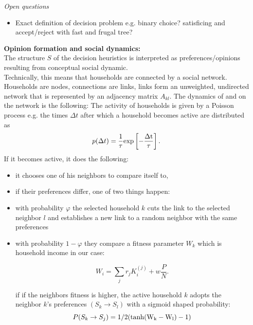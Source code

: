 \textit{Open questions}
\begin{itemize}
	\item Exact definition of decision problem e.g. binary choice? satisficing and accept/reject with fast and frugal tree?
\end{itemize}

\textbf{Opinion formation and social dynamics:} \\
The structure $S$ of the decision heuristics is interpreted as preferences/opinions resulting from conceptual social dynamic. \\
Technically, this means that households are connected by a social network. Households are nodes, connections are links, links form an unweighted, undirected network that is represented by an adjacency matrix $A_{kl}$.
The dynamics of and on the network is the following:
The activity of households is given by a Poisson process e.g. the times $\Delta t$ after which a household becomes active are distributed as
\begin{equation}
	p(\Delta t) = \frac{1}{\tau} \rm{exp}\left[-\frac{\Delta t}{\tau} \right].
	\label{waiting_time_distribution}
\end{equation}
If it becomes active, it does the following:
\begin{itemize}
	\item it chooses one of his neighbors to compare itself to,
	\item if their preferences differ, one of two things happen:
	\item with probability $\varphi$ the selected household $k$ cuts
		the link to the selected neighbor $l$ and establishes a new
		link to a random neighbor with the same preferences
	\item with probability $1-\varphi$ they compare a fitness parameter $W_k$
		which is household income in our case: 

		\begin{equation}
			W_i = \sum_j r_j K^{(j)}_{i} + w\frac{P}{N}.
			\label{eq:fitness}
		\end{equation}

		if if the neighbors fitness is higher, the active household $k$
		adopts the neighbor $k$'s preferences $(S_k \rightarrow S_l)$ with a sigmoid shaped 
		probability:
		\begin{equation}
			P(S_k \rightarrow S_j) = 1/2 (\rm{tanh}(W_k - W_l)-1)
			\label{imitation_probability}
		\end{equation}
\end{itemize}

